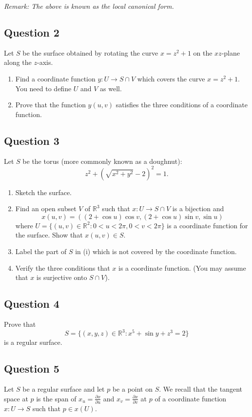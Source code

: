 \documentclass[12pt, a4paper]{article}
\newcommand{\R}{\mathbb{R}}
\begin{document}
\vspace{1em}
\noindent\textit{Remark: The above is known as the local canonical form.}
\newpage

\subsection*{Question 2}
Let $S$ be the surface obtained by rotating the curve $x=z^{2}+1$ on the $xz$-plane along the $z$-axis.
\begin{enumerate}[label=(\roman*)]
    \item Find a coordinate function $y: U\rightarrow S\cap V$ which covers the curve $x=z^2+1$. You need to define $U$ and $V$ as well.
    \item Prove that the function $y(u,v)$ satisfies the three conditions of a coordinate function.
\end{enumerate}
\newpage

\subsection*{Question 3}
Let $S$ be the torus (more commonly known as a doughnut):
\[ z^{2}+(\sqrt{x^{2}+y^{2}}-2)^{2}=1. \]
\begin{enumerate}[label=(\roman*)]
    \item Sketch the surface.
    \item Find an open subset $V$ of $\R^{3}$ such that $x:U\rightarrow S\cap V$ is a bijection and
    \[ x(u,v)=((2+\cos u)\cos v,(2+\cos u)\sin v,\sin u) \]
    where $U=\{(u,v)\in\R^{2}:0<u<2\pi,0<v<2\pi\}$ is a coordinate function for the surface. Show that $x(u,v)\in S$.
    \item Label the part of $S$ in (i) which is not covered by the coordinate function.
    \item Verify the three conditions that $x$ is a coordinate function. (You may assume that $x$ is surjective onto $S\cap V$).
\end{enumerate}
\newpage

\subsection*{Question 4}
Prove that
\[ S=\{(x,y,z)\in\R^{3}:x^{5}+\sin y+z^{3}=2\} \]
is a regular surface.
\newpage

\subsection*{Question 5}
Let $S$ be a regular surface and let $p$ be a point on $S$. We recall that the tangent space at $p$ is the span of $x_{u}=\frac{\partial x}{\partial u}$ and $x_{v}=\frac{\partial x}{\partial v}$ at $p$ of a coordinate function $x: U\rightarrow S$ such that $p\in x(U)$. 
\end{document}
